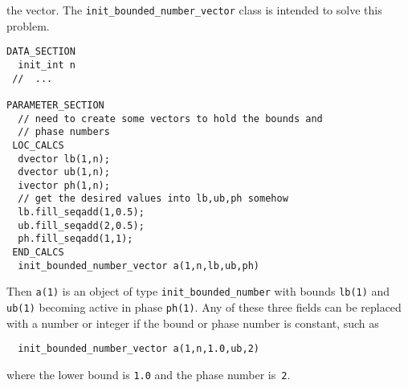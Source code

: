 the vector. The \texttt{init\_bounded\_number\_vector} class
is intended to solve this problem.
\begin{lstlisting}
DATA_SECTION
  init_int n
 //  ...

PARAMETER_SECTION
  // need to create some vectors to hold the bounds and
  // phase numbers
 LOC_CALCS
  dvector lb(1,n); 
  dvector ub(1,n); 
  ivector ph(1,n); 
  // get the desired values into lb,ub,ph somehow 
  lb.fill_seqadd(1,0.5);
  ub.fill_seqadd(2,0.5);
  ph.fill_seqadd(1,1);
 END_CALCS
  init_bounded_number_vector a(1,n,lb,ub,ph)
\end{lstlisting} 
Then \texttt{a(1)} is an object of type
\texttt{init\_bounded\_number} with bounds \texttt{lb(1)} and 
\texttt{ub(1)} becoming active in phase \texttt{ph(1)}. 
Any of these three fields can be replaced with a number or
integer if the bound or phase number is constant, such as
\begin{lstlisting}
  init_bounded_number_vector a(1,n,1.0,ub,2)
\end{lstlisting} 
where the lower bound is \texttt{1.0} and the
phase number is~\texttt{2}.


